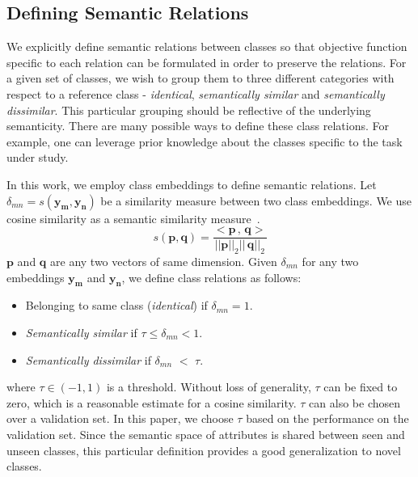 \documentclass[10pt,twocolumn,letterpaper]{article}
\begin{document}
\subsection{Defining Semantic Relations}
\label{relations}
We explicitly define semantic relations between classes so that objective function specific to each relation can be formulated in order to preserve the relations. For a given set of classes, we wish to group them to three different categories with respect to a reference class - \textit{identical}, \textit{semantically similar} and \textit{semantically dissimilar}. This particular grouping should be reflective of the underlying semanticity. There are many possible ways to define these class relations. For example, one can leverage prior knowledge about the classes specific to the task under study. 

In this work, we employ class embeddings to 
define semantic relations. Let $\delta_{mn}=s(\mathbf{y_m},\mathbf{y_n})$ be a similarity measure between two class embeddings. We use cosine similarity as a semantic similarity measure~\cite{mikolov2013distributed,mikolov2013efficient}.
\begin{equation}
s(\mathbf{p},\mathbf{q}) = \dfrac{<\mathbf{p}\, ,\, \mathbf{q}>}{||\mathbf{p}||_2||\, \mathbf{q}||_2}
\end{equation}
$\mathbf{p}$ and $\mathbf{q}$ are any two vectors of same dimension.
Given $\delta_{mn}$ for any two embeddings $\mathbf{y_m}$ and $\mathbf{y_n}$, we define class relations as follows:
\begin{itemize}
	\itemsep0em
	\item Belonging to same class (\textit{identical}) if $\delta_{mn}  =1$.
	\item \textit{Semantically similar} if $ \tau \leq \delta_{mn} < 1$.
	\item \textit{Semantically dissimilar} if $\delta_{mn}$ $<$ $\tau$.
\end{itemize}
where $\tau\in (-1,1)$ is a threshold. Without loss of generality, $\tau$ can be fixed to zero, which is a reasonable estimate for a cosine similarity. $\tau$ can also be chosen over a validation set. 
In this paper, we choose $\tau$ based on the performance on the validation set.
Since the semantic space of attributes is shared between seen and unseen classes, this particular definition provides a good generalization to novel classes.
\end{document}
